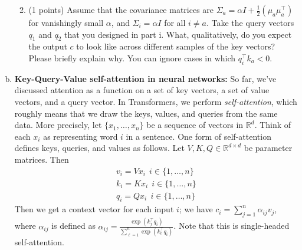 \begin{enumerate}[(a)]
\begin{enumerate}
    \begin{answer}
    \end{answer}

    \item (1 points) Assume that the covariance matrices are $\Sigma_a=\alpha I + \frac{1}{2}(\mu_a\mu_a^\top)$ for vanishingly small $\alpha$, and $\Sigma_i=\alpha I$  for all $i \neq a$.
    Take the query vectors $q_1$ and $q_2$ that you designed in part i.
    What, qualitatively, do you expect the output $c$ to look like across different samples of the key vectors? Please briefly explain why. You can ignore cases in which $q_i^\top k_a < 0$.

    \begin{answer}
    \end{answer}

    \end{enumerate}

\item {} \textbf{Key-Query-Value self-attention in neural networks:}
So far, we've discussed attention as a function on a set of key vectors, a set of value vectors, and a query vector.
In Transformers, we perform \textit{self-attention}, which roughly means that we draw the keys, values, and queries from the same data.
More precisely, let $\{x_1,\dots,x_n\}$ be a sequence of vectors in $\mathbb{R}^d$. 
Think of each $x_i$ as representing word $i$ in a sentence.
One form of self-attention defines keys, queries, and values as follows.
Let $V,K,Q \in \mathbb{R}^{d\times d}$ be parameter matrices. Then
\begin{align}
v_i = Vx_i\ \ i \in \{1,\dots,n\}\\
k_i = Kx_i\ \ i \in \{1,\dots,n\}\\
q_i = Qx_i\ \ i \in \{1,\dots,n\}
\end{align}
Then we get a context vector for each input $i$; we have $c_i = \sum_{j=1}^{n} \alpha_{ij} v_j$, where $\alpha_{ij}$ is defined as $\alpha_{ij} = \frac{\exp(k_j^\top q_i)}{\sum_{\ell=1}^{n}\exp(k_\ell^\top q_i)}$.
Note that this is single-headed self-attention.


\end{enumerate}
